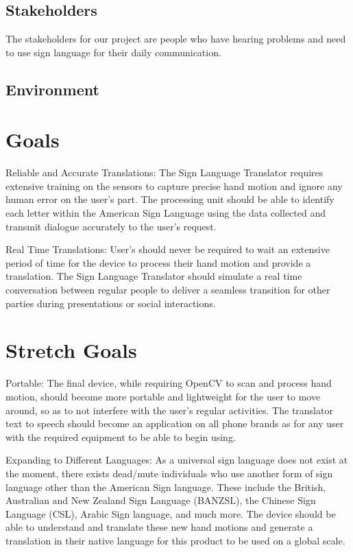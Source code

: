 \documentclass{article}
\begin{document}
\subsection{Stakeholders}
The stakeholders for our project are people who have hearing problems and need to use sign language for their daily communication.
\subsection{Environment}


\section{Goals}

Reliable and Accurate Translations:
The Sign Language Translator requires extensive training on the sensors to capture precise hand motion and ignore any human error on the user’s part. The processing unit should be able to identify each letter within the American Sign Language using the data collected and transmit dialogue accurately to the user’s request.

Real Time Translations:
User’s should never be required to wait an extensive period of time for the device to process their hand motion and provide a translation. The Sign Language Translator should simulate a real time conversation between regular people to deliver a seamless transition for other parties during presentations or social interactions.

\section{Stretch Goals}

Portable:
The final device, while requiring OpenCV to scan and process hand motion, should become more portable and lightweight for the user to move around, so as to not interfere with the user’s regular activities. The translator text to speech should become an application on all phone brands as for any user with the required equipment to be able to begin using.

Expanding to Different Languages:
As a universal sign language does not exist at the moment, there exists dead/mute individuals who use another form of sign language other than the American Sign language. These include the British, Australian and New Zealand Sign Language (BANZSL), the Chinese Sign Language (CSL), Arabic Sign language, and much more. The device should be able to understand and translate these new hand motions and generate a translation in their native language for this product to be used on a global scale.
\end{document}
